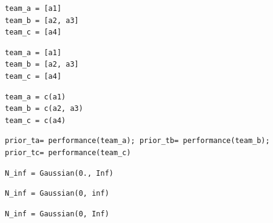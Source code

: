\documentclass[a4paper,10pt]{book}
\theoremstyle{definition}
\newif\ifen
\newif\ifes
\newcommand{\en}[1]{\ifen#1\fi}
\newcommand{\es}[1]{\ifes#1\fi}
\begin{document}
\en{Before we start, we set the landscape: we compute the prior performance of the teams using the function \texttt{performance()}; we initialize the undefined messages using a neutral form, such as a Gaussian distribution with an infinite variance; and we compute the margins for each comparison $d_j$. }%
\es{Antes de empezar preparamos el escenario: computamos el desempeño a priori de los equipos usando la función \texttt{performance()}; inicializamos los mensajes que a\'un no est\'an definidos con una forma neutra, como una distribuci\'on gaussiana con varianza infinita; y calculamos los márgenes de cada comparaci\'on $d_j$. }%
%
\begin{lstlisting}[backgroundcolor=\color{all}, label=lst:graphical_model, caption={\en{Setting the landscape}\es{Preparación del escenario}}, belowskip=-1.0 \baselineskip, aboveskip=0.1cm]
\end{lstlisting}
\begin{paracol}{3}
\begin{lstlisting}[backgroundcolor=\color{julia!60}, belowskip=-0.77 \baselineskip]
team_a = [a1]
team_b = [a2, a3]
team_c = [a4]
\end{lstlisting}
  \switchcolumn
\begin{lstlisting}[backgroundcolor=\color{python!60}, belowskip=-0.77 \baselineskip]
team_a = [a1]
team_b = [a2, a3]
team_c = [a4]
\end{lstlisting}
   \switchcolumn
\begin{lstlisting}[backgroundcolor=\color{r!50}, belowskip=-0.77 \baselineskip]
team_a = c(a1)
team_b = c(a2, a3)
team_c = c(a4)
\end{lstlisting}  
\end{paracol}
\begin{lstlisting}[backgroundcolor=\color{all},belowskip=-0.77 \baselineskip]
prior_ta= performance(team_a); prior_tb= performance(team_b); prior_tc= performance(team_c)
\end{lstlisting}
\begin{paracol}{3}
\begin{lstlisting}[backgroundcolor=\color{julia!60},belowskip=-0.77 \baselineskip]
N_inf = Gaussian(0., Inf)
\end{lstlisting}
\switchcolumn
\begin{lstlisting}[backgroundcolor=\color{python!60},belowskip=-0.77 \baselineskip]
N_inf = Gaussian(0, inf)
\end{lstlisting}
\switchcolumn
\begin{lstlisting}[backgroundcolor=\color{r!50},belowskip=-0.77 \baselineskip]
N_inf = Gaussian(0, Inf)
\end{lstlisting}
\end{paracol}
\end{document}
